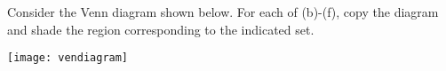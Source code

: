 \documentclass[12pt,letterpaper, onecolumn]{exam}
\begin{document}
\begin{questions}
\begin{solution}
	\end{solution}
	\setcounter{question}{16}\question Consider the Venn diagram shown below. For each of (b)-(f), copy the diagram and shade the region corresponding to the indicated set.
	\begin{center}
		\texttt{[image: vendiagram]}
		\caption{}
		\label{fig:vendiagram}
	\end{center}
	
	\begin{parts}
		\setcounter{partno}{1}\part $B\cup C$ 

\end{parts}
\end{questions}
\end{document}
